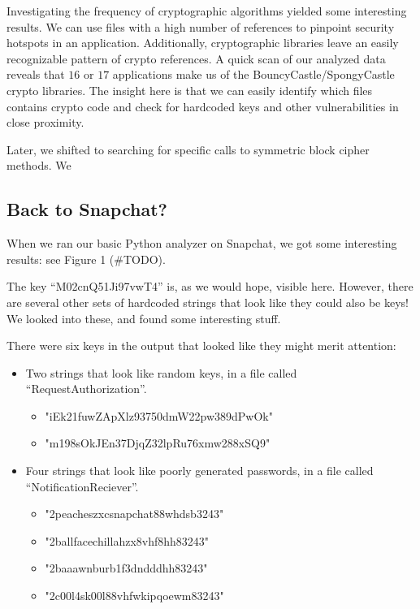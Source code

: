 \documentclass[11pt]{article}
\numberwithin{theorem}{subsection}
\begin{document}
  Investigating the frequency of cryptographic algorithms yielded some interesting results. We can use
files with a high number of references to pinpoint security hotspots in an application. Additionally, 
cryptographic libraries leave an easily recognizable pattern of crypto references. A quick scan
of our analyzed data reveals that $16$ or $17$ applications make us of the BouncyCastle/SpongyCastle crypto
libraries. The insight here is that we can easily identify which files contains crypto code and check
for hardcoded keys and other vulnerabilities in close proximity.

  Later, we shifted to searching for specific calls to symmetric block cipher methods. We 

\subsection{Back to Snapchat?}

When we ran our basic Python analyzer on Snapchat, we got some interesting results: see Figure 1 (\#TODO).

The key ``M02cnQ51Ji97vwT4'' is, as we would hope, visible here.  However, there are several other sets of
hardcoded strings that look like they could also be keys!  We looked into these, and found some interesting stuff.

There were six keys in the output that looked like they might merit attention:

\begin{itemize}
\item Two strings that look like random keys, in a file called ``RequestAuthorization''. 
\begin{itemize}
\item "iEk21fuwZApXlz93750dmW22pw389dPwOk"
\item "m198sOkJEn37DjqZ32lpRu76xmw288xSQ9"
\end{itemize}
\item Four strings that look like poorly generated passwords, in a file called ``NotificationReciever''.
\begin{itemize}
\item "2peacheszxcsnapchat88whdsb3243"
\item "2ballfacechillahzx8vhf8hh83243"
\item "2baaawnburb1f3dndddhh83243"
\item "2c00l4sk00l88vhfwkipqoewm83243"
\end{itemize}
\end{itemize}
\end{document}
